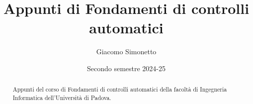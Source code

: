 \documentclass[a4paper]{article}
\title{Appunti di Fondamenti di controlli automatici}
\author{Giacomo Simonetto}
\date{Secondo semestre 2024-25}
\begin{document}
\maketitle
\begin{abstract}
	Appunti del corso di Fondamenti di controlli automatici della facoltà di Ingegneria Informatica dell'Università di Padova.
\end{abstract}

\newpage

\tableofcontents

\newpage





\end{document}
